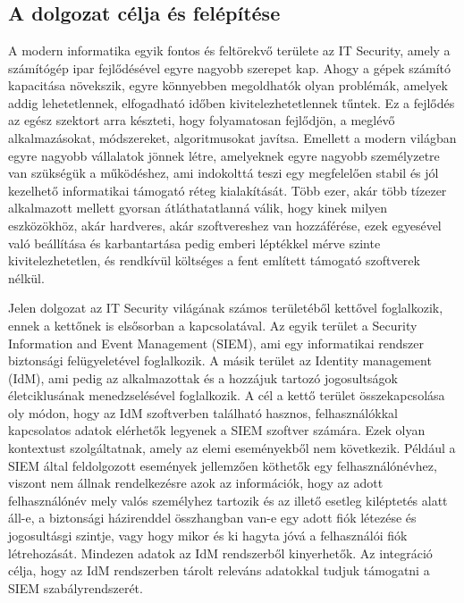 \chapter{\bevezetes}
\label{ch:bev}
\selecthungarian


\section{A dolgozat célja és felépítése }
A modern informatika egyik fontos és feltörekvő területe az IT Security, amely a számítógép ipar fejlődésével egyre nagyobb szerepet kap. Ahogy a gépek számító kapacitása növekszik, egyre könnyebben megoldhatók olyan problémák, amelyek addig lehetetlennek, elfogadható időben kivitelezhetetlennek tűntek. Ez a fejlődés az egész szektort arra készteti, hogy folyamatosan fejlődjön, a meglévő alkalmazásokat, módszereket, algoritmusokat javítsa. Emellett a modern világban egyre nagyobb vállalatok jönnek létre, amelyeknek egyre nagyobb személyzetre van szükségük a működéshez, ami indokolttá teszi egy megfelelően stabil és jól kezelhető informatikai támogató réteg kialakítását. Több ezer, akár több tízezer alkalmazott mellett gyorsan átláthatatlanná válik, hogy kinek milyen eszközökhöz, akár hardveres, akár szoftvereshez van hozzáférése, ezek egyesével való beállítása és karbantartása pedig emberi léptékkel mérve szinte kivitelezhetetlen, és rendkívül költséges a fent említett támogató szoftverek nélkül.

 Jelen dolgozat az IT Security világának számos területéből kettővel foglalkozik, ennek a kettőnek is elsősorban a kapcsolatával. Az egyik terület a Security Information and Event Management (SIEM), ami egy informatikai rendszer biztonsági felügyeletével foglalkozik. A másik terület az Identity management (IdM), ami pedig az alkalmazottak és a hozzájuk tartozó jogosultságok életciklusának menedzselésével foglalkozik. A cél a kettő terület összekapcsolása oly módon, hogy az IdM szoftverben található hasznos, felhasználókkal kapcsolatos adatok elérhetők legyenek a SIEM szoftver számára. Ezek olyan kontextust szolgáltatnak, amely az elemi eseményekből nem következik. Például a SIEM által feldolgozott események jellemzően köthetők egy felhasználónévhez, viszont nem állnak rendelkezésre azok az információk, hogy az adott felhasználónév mely valós személyhez tartozik és az illető esetleg kiléptetés alatt áll-e, a biztonsági házirenddel összhangban van-e egy adott fiók létezése és jogosultásgi szintje, vagy hogy mikor és ki hagyta jóvá a felhasználói fiók létrehozását. Mindezen adatok az IdM rendszerből kinyerhetők. Az integráció célja, hogy az IdM rendszerben tárolt releváns adatokkal tudjuk támogatni a SIEM szabályrendszerét.

